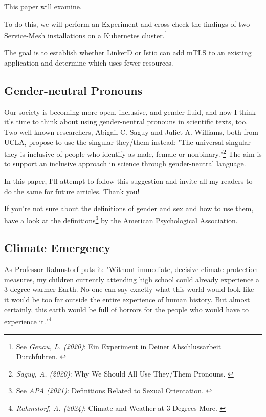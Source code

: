 This paper will examine.

To do this, we will perform an Experiment and cross-check the findings of two Service-Mesh installations on a Kubernetes cluster.\footnote{See \textit{Genau, L. (2020)}: Ein Experiment in Deiner Abschlussarbeit Durchführen. \cite{expScribbr}}

The goal is to establish whether LinkerD or Istio can add mTLS to an existing application and determine which uses fewer resources.

\subsection{Gender-neutral Pronouns}

Our society is becoming more open, inclusive, and gender-fluid, and now I think it's time to think about using gender-neutral pronouns in scientific texts, too. Two well-known researchers, Abigail C. Saguy and Juliet A. Williams, both from UCLA, propose to use the singular they/them instead: "The universal singular they is inclusive of people who identify as male, female or nonbinary."\footnote{\textit{Saguy, A. (2020)}: Why We Should All Use They/Them Pronouns. \cite{pronouns}} The aim is to support an inclusive approach in science through gender-neutral language. 

In this paper, I'll attempt to follow this suggestion and invite all my readers to do the same for future articles. Thank you!

If you're not sure about the definitions of gender and sex and how to use them, have a look at the definitions\footnote{See \textit{APA (2021)}: Definitions Related to Sexual Orientation. \cite{apaDefinitions}} by the American Psychological Association.

\subsection{Climate Emergency}

As Professor Rahmstorf puts it: "Without immediate, decisive climate protection measures, my children currently attending high school could already experience a 3-degree warmer Earth. No one can say exactly what this world would look like—it would be too far outside the entire experience of human history. But almost certainly, this earth would be full of horrors for the people who would have to experience it."\footnote{\textit{Rahmstorf, A. (2024)}: Climate and Weather at 3 Degrees More. \cite{3dgreesMore}}
